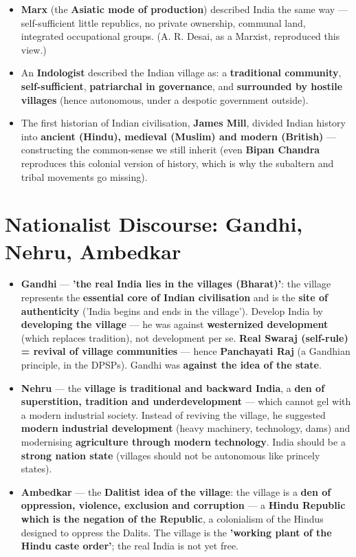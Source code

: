 \begin{KeyConcept}
\begin{itemize}
\item \textbf{Marx} (the \textbf{Asiatic mode of production}) described India the same way --- self-sufficient little republics, no private ownership, communal land, integrated occupational groups. (A. R. Desai, as a Marxist, reproduced this view.)
\item An \textbf{Indologist} described the Indian village as: a \textbf{traditional community}, \textbf{self-sufficient}, \textbf{patriarchal in governance}, and \textbf{surrounded by hostile villages} (hence autonomous, under a despotic government outside).
\item The first historian of Indian civilisation, \textbf{James Mill}, divided Indian history into \textbf{ancient (Hindu), medieval (Muslim) and modern (British)} --- constructing the common-sense we still inherit (even \textbf{Bipan Chandra} reproduces this colonial version of history, which is why the subaltern and tribal movements go missing).
\end{itemize}
\end{KeyConcept}

\section{Nationalist Discourse: Gandhi, Nehru, Ambedkar}

\begin{KeyConcept}
\begin{itemize}
\item \textbf{Gandhi} --- \textbf{'the real India lies in the villages (Bharat)'}: the village represents the \textbf{essential core of Indian civilisation} and is the \textbf{site of authenticity} ('India begins and ends in the village'). Develop India by \textbf{developing the village} --- he was against \textbf{westernized development} (which replaces tradition), not development per se. \textbf{Real Swaraj (self-rule) = revival of village communities} --- hence \textbf{Panchayati Raj} (a Gandhian principle, in the DPSPs). Gandhi was \textbf{against the idea of the state}.
\item \textbf{Nehru} --- the \textbf{village is traditional and backward India}, a \textbf{den of superstition, tradition and underdevelopment} --- which cannot gel with a modern industrial society. Instead of reviving the village, he suggested \textbf{modern industrial development} (heavy machinery, technology, dams) and modernising \textbf{agriculture through modern technology}. India should be a \textbf{strong nation state} (villages should not be autonomous like princely states).
\item \textbf{Ambedkar} --- the \textbf{Dalitist idea of the village}: the village is a \textbf{den of oppression, violence, exclusion and corruption} --- a \textbf{Hindu Republic which is the negation of the Republic}, a colonialism of the Hindus designed to oppress the Dalits. The village is the \textbf{'working plant of the Hindu caste order'}; the real India is not yet free.
\end{itemize}
\end{KeyConcept}

